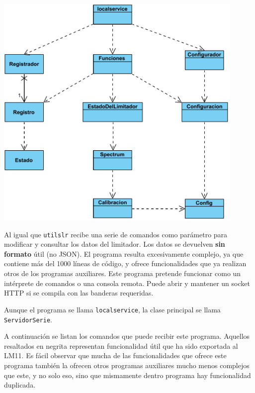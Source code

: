 

\begin{center}
    \includegraphics[width=0.9\textwidth]{figuras/lms9-localservice.pdf}
    \label{fig:localservice}
\end{center}

Al igual que \verb|utilslr| recibe una serie de comandos como parámetro para modificar y consultar los datos del limitador. Los datos se devuelven \textbf{sin formato} útil (no JSON). El programa resulta excesivamente complejo, ya que contiene más del 1000 líneas de código, y ofrece funcionalidades que ya realizan otros de los programas auxiliares. Este programa pretende funcionar como un intérprete de comandos o una consola remota. Puede abrir y mantener un socket HTTP si se compila con las banderas requeridas.

Aunque el programa se llama \verb|localservice|, la clase principal se llama \verb|ServidorSerie|.

A continuación se listan los comandos que puede recibir este programa. Aquellos resaltados en negrita representan funcionalidad útil que ha sido exportada al LM11. Es fácil observar que mucha de las funcionalidades que ofrece este programa también la ofrecen otros programas auxiliares mucho menos complejos que este, y no solo eso, sino que mismamente dentro programa hay funcionalidad duplicada.

